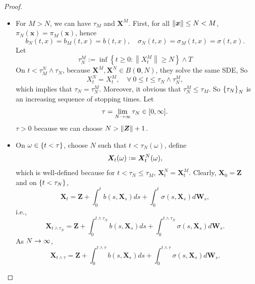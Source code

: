 \begin{proof}
\begin{itemize}
        \item For $M > N$, we can have $\tau_M$ and $\bm{X}^M$. First, for all $\left\lVert\bm{x}\right\lVert \leq N < M$, $\pi_N(\bm{x}) = \pi_M(\bm{x})$, hence
        \begin{equation*}
            b_N(t, x)=b_M(t, x)=b(t, x), \quad \sigma_N(t, x)=\sigma_M(t, x)=\sigma(t, x) .
        \end{equation*}
        Let
        \begin{equation*}
            \tau_N^M:=\inf \left\{t \geq 0:\left\|X_t^M\right\| \geq N\right\} \wedge T
        \end{equation*}
        On $t < \tau_M^N \wedge \tau_N$, because $\bm{X}^M,\bm{X}^N \in B(\bm{0},N)$, they solve the same SDE, So
        \begin{equation*}
            X_t^N=X_t^M, \quad \forall~ 0 \leq t \leq \tau_N \wedge \tau_N^M,
        \end{equation*}
        which implies that $\tau_N = \tau_N^M$. Moreover, it obvious that $\tau_N^M \leq \tau_M$. So $\left\{\tau_N\right\}_N$ is an increasing sequence of stopping times. Let
        \begin{equation*}
            \tau = \lim_{N \rightarrow \infty}\tau_N \in [0,\infty].
        \end{equation*}
        $\tau > 0$ because we can choose $N > \left\lVert\bm{Z}\right\lVert + 1$.

        \item On $\omega \in \left\{t < \tau\right\}$, choose $N$ such that $t < \tau_N(\omega)$, define
        \begin{equation*}
            \bm{X}_t(\omega) \vcentcolon= \bm{X}^N_t(\omega),
        \end{equation*} 
        which is well-defined because for $t < \tau_N \leq \tau_M$, $\bm{X}^N_t = \bm{X}^M_t$. Clearly, $\bm{X}_0 = \bm{Z}$ and on $\left\{t < \tau_N\right\}$,
        \begin{equation*}
            \bm{X}_{t} = \bm{Z} + \int_0^{t}b(s,\bm{X}_s)ds+\int_0^{t}\sigma(s,\bm{X}_s)d\bm{W}_s,
        \end{equation*}
        i.e.,
        \begin{equation*}
            \bm{X}_{t \wedge \tau_N} = \bm{Z} + \int_0^{t \wedge \tau_N}b(s,\bm{X}_s)ds+\int_0^{t \wedge \tau_N}\sigma(s,\bm{X}_s)d\bm{W}_s.
        \end{equation*}
        As $N \rightarrow \infty$,
        \begin{equation*}
            \bm{X}_{t \wedge \tau} = \bm{Z} + \int_0^{t \wedge \tau}b(s,\bm{X}_s)ds+\int_0^{t \wedge \tau}\sigma(s,\bm{X}_s)d\bm{W}_s.
        \end{equation*}


\end{itemize}
\end{proof}
